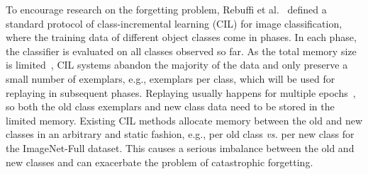 \documentclass{article}
\begin{document}
To encourage research on the forgetting problem, Rebuffi et al.~\cite{rebuffi2017icarl} defined a standard protocol of class-incremental learning (CIL) for image classification, where the training data of different object classes come in phases. In each phase, the classifier is evaluated on all classes observed so far. As the total memory size is limited~\cite{rebuffi2017icarl}, CIL systems abandon the majority of the data and only preserve a small number of exemplars, e.g.,  exemplars per class, which will be used for replaying in subsequent phases. Replaying usually happens for multiple epochs~\cite{douillard2020podnet,hou2019lucir,Liu2020AANets,rebuffi2017icarl}, so both the old class exemplars and new class data need to be stored in the limited memory. Existing CIL methods allocate memory between the old and new classes in an arbitrary and static fashion, e.g.,  per old class \emph{vs.}  per new class for the ImageNet-Full dataset. This causes a serious imbalance between the old and new classes and can exacerbate the problem of catastrophic forgetting.
\end{document}
